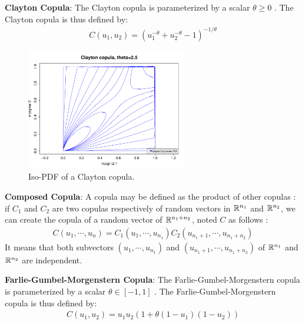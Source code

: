 {  {\bf Clayton Copula}: The Clayton copula is parameterized by a scalar $\theta \geq 0 $ . The Clayton copula is thus defined by:
  \begin{align*}
    C(u_1, u_2) =\displaystyle \left(u_1^{-\theta}+u_2^{-\theta}-1\right)^{-1/\theta}
  \end{align*}



  \begin{figure}[H]
    \begin{center}
      \includegraphics[width=7cm]{Figures/ClaytonCopula.pdf}
      \caption{Iso-PDF of a  Clayton copula.}
    \end{center}
  \end{figure}


  {\bf Composed Copula}:
  A copula may be defined as the product of other copulas : if $C_1$ and $C_2$ are two copulas respectively of random vectors in  ${\mathbb R}^{n_1}$ and ${\mathbb R}^{n_2}$, we can create the copula of a random vector of ${\mathbb R}^{n_1+n_2}$, noted $C$ as follows :
  \begin{align*}
    C(u_1, \cdots, u_n) = C_1(u_1, \cdots, u_{n_1}) C_2(u_{n_1+1}, \cdots, u_{n_1+n_2})
  \end{align*}
  It means that both subvectors $(u_1, \cdots, u_{n_1})$ and $(u_{n_1+1}, \cdots, u_{n_1+n_2})$ of ${\mathbb R}^{n_1}$ and ${\mathbb R}^{n_2}$ are independent.




  {\bf Farlie-Gumbel-Morgenstern Copula}: The Farlie-Gumbel-Morgenstern copula is parameterized by a scalar $\theta \in [-1,1] $ . The Farlie-Gumbel-Morgenstern copula is thus defined by:
  \begin{align*}
    C(u_1, u_2) =\displaystyle u_1u_2 (1 + \theta(1 - u_1)(1 - u_2))
  \end{align*}



}
